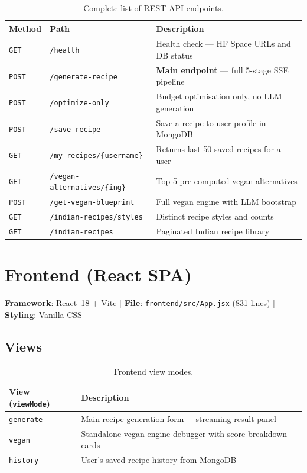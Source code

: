\documentclass[12pt, a4paper]{article}
\begin{document}
\begin{table}[H]
\centering
\caption{Complete list of REST API endpoints.}
\label{tab:endpoints}
\begin{tabularx}{\textwidth}{l l X}
\toprule
\textbf{Method} & \textbf{Path} & \textbf{Description} \\
\midrule
\texttt{GET}  & \texttt{/health}                     & Health check --- HF Space URLs and DB status \\
\texttt{POST} & \texttt{/generate-recipe}            & \textbf{Main endpoint} --- full 5-stage SSE pipeline \\
\texttt{POST} & \texttt{/optimize-only}              & Budget optimisation only, no LLM generation \\
\texttt{POST} & \texttt{/save-recipe}                & Save a recipe to user profile in MongoDB \\
\texttt{GET}  & \texttt{/my-recipes/\{username\}}    & Returns last 50 saved recipes for a user \\
\texttt{GET}  & \texttt{/vegan-alternatives/\{ing\}} & Top-5 pre-computed vegan alternatives \\
\texttt{POST} & \texttt{/get-vegan-blueprint}        & Full vegan engine with LLM bootstrap \\
\texttt{GET}  & \texttt{/indian-recipes/styles}      & Distinct recipe styles and counts \\
\texttt{GET}  & \texttt{/indian-recipes}             & Paginated Indian recipe library \\
\bottomrule
\end{tabularx}
\end{table}

\section{Frontend (React SPA)}

\textbf{Framework}: React~18 + Vite $|$ \textbf{File}: \texttt{frontend/src/App.jsx} (831 lines) $|$ \textbf{Styling}: Vanilla CSS

\subsection{Views}

\begin{table}[H]
\centering
\caption{Frontend view modes.}
\label{tab:views}
\begin{tabularx}{\textwidth}{l X}
\toprule
\textbf{View (\texttt{viewMode})} & \textbf{Description} \\
\midrule
\texttt{generate} & Main recipe generation form + streaming result panel \\
\texttt{vegan}    & Standalone vegan engine debugger with score breakdown cards \\
\texttt{history}  & User's saved recipe history from MongoDB \\
\bottomrule
\end{tabularx}
\end{table}
\end{document}
